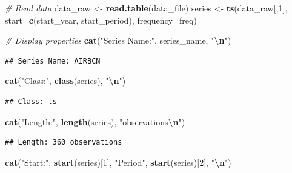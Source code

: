 \documentclass[
]{article}
\newenvironment{Shaded}{\begin{snugshade}}{\end{snugshade}}
\newcommand{\AttributeTok}[1]{\textcolor[rgb]{0.13,0.29,0.53}{#1}}
\newcommand{\CommentTok}[1]{\textcolor[rgb]{0.56,0.35,0.01}{\textit{#1}}}
\newcommand{\DecValTok}[1]{\textcolor[rgb]{0.00,0.00,0.81}{#1}}
\newcommand{\FunctionTok}[1]{\textcolor[rgb]{0.13,0.29,0.53}{\textbf{#1}}}
\newcommand{\NormalTok}[1]{#1}
\newcommand{\OtherTok}[1]{\textcolor[rgb]{0.56,0.35,0.01}{#1}}
\newcommand{\SpecialCharTok}[1]{\textcolor[rgb]{0.81,0.36,0.00}{\textbf{#1}}}
\newcommand{\StringTok}[1]{\textcolor[rgb]{0.31,0.60,0.02}{#1}}
\begin{document}
\begin{Shaded}
\begin{Highlighting}[]
\CommentTok{\# Read data}
\NormalTok{data\_raw }\OtherTok{\textless{}{-}} \FunctionTok{read.table}\NormalTok{(data\_file)}
\NormalTok{series }\OtherTok{\textless{}{-}} \FunctionTok{ts}\NormalTok{(data\_raw[,}\DecValTok{1}\NormalTok{], }\AttributeTok{start=}\FunctionTok{c}\NormalTok{(start\_year, start\_period), }\AttributeTok{frequency=}\NormalTok{freq)}

\CommentTok{\# Display properties}
\FunctionTok{cat}\NormalTok{(}\StringTok{"Series Name:"}\NormalTok{, series\_name, }\StringTok{"}\SpecialCharTok{\textbackslash{}n}\StringTok{"}\NormalTok{)}
\end{Highlighting}
\end{Shaded}

\begin{verbatim}
## Series Name: AIRBCN
\end{verbatim}

\begin{Shaded}
\begin{Highlighting}[]
\FunctionTok{cat}\NormalTok{(}\StringTok{"Class:"}\NormalTok{, }\FunctionTok{class}\NormalTok{(series), }\StringTok{"}\SpecialCharTok{\textbackslash{}n}\StringTok{"}\NormalTok{)}
\end{Highlighting}
\end{Shaded}

\begin{verbatim}
## Class: ts
\end{verbatim}

\begin{Shaded}
\begin{Highlighting}[]
\FunctionTok{cat}\NormalTok{(}\StringTok{"Length:"}\NormalTok{, }\FunctionTok{length}\NormalTok{(series), }\StringTok{"observations}\SpecialCharTok{\textbackslash{}n}\StringTok{"}\NormalTok{)}
\end{Highlighting}
\end{Shaded}

\begin{verbatim}
## Length: 360 observations
\end{verbatim}

\begin{Shaded}
\begin{Highlighting}[]
\FunctionTok{cat}\NormalTok{(}\StringTok{"Start:"}\NormalTok{, }\FunctionTok{start}\NormalTok{(series)[}\DecValTok{1}\NormalTok{], }\StringTok{"Period"}\NormalTok{, }\FunctionTok{start}\NormalTok{(series)[}\DecValTok{2}\NormalTok{], }\StringTok{"}\SpecialCharTok{\textbackslash{}n}\StringTok{"}\NormalTok{)}
\end{Highlighting}
\end{Shaded}
\end{document}
